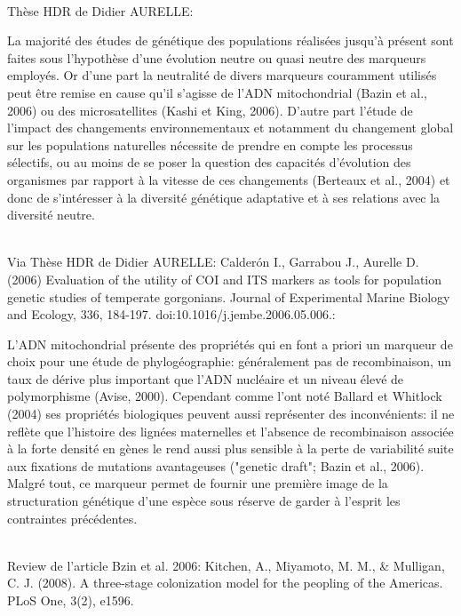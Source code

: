 \documentclass[a4paper]{article}
\begin{document}
~~\\
Thèse HDR de Didier AURELLE:

La majorité des études de génétique des populations réalisées jusqu'à présent sont faites sous l'hypothèse d'une évolution neutre ou quasi neutre des marqueurs employés. Or d'une part la neutralité de divers marqueurs couramment utilisés peut être remise en cause qu'il s'agisse de l'ADN mitochondrial (Bazin et al., 2006) ou des microsatellites (Kashi et King, 2006). D'autre part l'étude de l'impact des changements environnementaux et notamment du changement global sur les populations naturelles nécessite de prendre en compte les processus sélectifs, ou au moins de se poser la question des capacités d'évolution des organismes par rapport à la vitesse de ces changements (Berteaux et al., 2004) et donc de s'intéresser à la diversité génétique adaptative et à ses relations avec la diversité neutre.


~~\\

Via Thèse HDR de Didier AURELLE: Calderón I., Garrabou J., Aurelle D. (2006) Evaluation of the utility of COI and ITS markers as tools for population genetic studies of temperate gorgonians. Journal of Experimental Marine Biology and Ecology, 336, 184-197. doi:10.1016/j.jembe.2006.05.006.:


L'ADN mitochondrial présente des propriétés qui en font a priori un marqueur de choix pour une étude de phylogéographie: généralement pas de recombinaison, un taux de dérive plus important que l'ADN nucléaire et un niveau élevé de polymorphisme (Avise, 2000). Cependant comme l'ont noté Ballard et Whitlock (2004) ses propriétés biologiques peuvent aussi représenter des inconvénients: il ne reflète que l'histoire des lignées maternelles et l'absence de recombinaison associée à la forte densité en gènes le rend aussi plus sensible à la perte de variabilité suite aux fixations de mutations avantageuses ("genetic draft"; Bazin et al., 2006). Malgré tout, ce marqueur permet de fournir une première image de la structuration génétique d'une espèce sous réserve de garder à l'esprit les contraintes précédentes.

~~\\

Review de l'article Bzin et al. 2006: Kitchen, A., Miyamoto, M. M., & Mulligan, C. J. (2008). A three-stage colonization model for the peopling of the Americas. PLoS One, 3(2), e1596.
\end{document}
